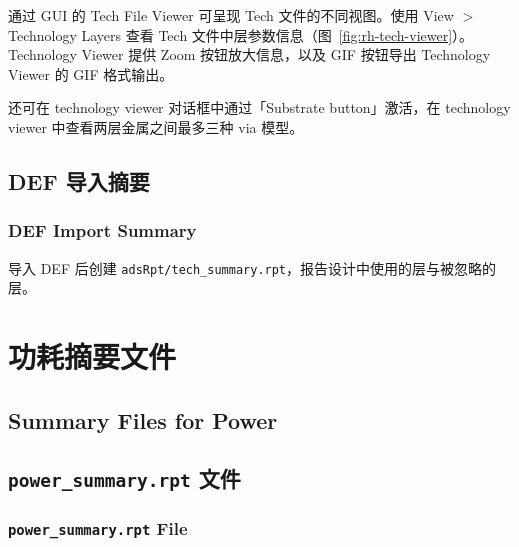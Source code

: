 通过 GUI 的 Tech File Viewer 可呈现 Tech 文件的不同视图。使用 View $>$ Technology Layers 查看 Tech 文件中层参数信息（图~\ref{fig:rh-tech-viewer}）。Technology Viewer 提供 Zoom 按钮放大信息，以及 GIF 按钮导出 Technology Viewer 的 GIF 格式输出。

\label{fig:rh-tech-viewer}

还可在 technology viewer 对话框中通过「Substrate button」激活，在 technology viewer 中查看两层金属之间最多三种 via 模型。

\subsection{DEF 导入摘要}
\subsubsection*{DEF Import Summary}

导入 DEF 后创建 \texttt{adsRpt/tech\_summary.rpt}，报告设计中使用的层与被忽略的层。

\section{功耗摘要文件}
\subsection*{Summary Files for Power}

\subsection{\texttt{power\_summary.rpt} 文件}
\subsubsection*{\texttt{power\_summary.rpt} File}

